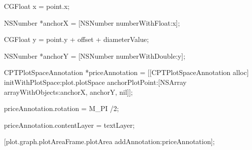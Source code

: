     

    

    

    CGFloat x = point.x;

    NSNumber *anchorX = [NSNumber numberWithFloat:x];

    

    CGFloat y = point.y + offset + diameterValue;

    NSNumber *anchorY = [NSNumber numberWithDouble:y];

    

    CPTPlotSpaceAnnotation *priceAnnotation = [[CPTPlotSpaceAnnotation alloc] initWithPlotSpace:plot.plotSpace anchorPlotPoint:[NSArray arrayWithObjects:anchorX, anchorY, nil]];

    priceAnnotation.rotation = M_PI /2;

    

    

    priceAnnotation.contentLayer = textLayer;

    

    [plot.graph.plotAreaFrame.plotArea addAnnotation:priceAnnotation];
